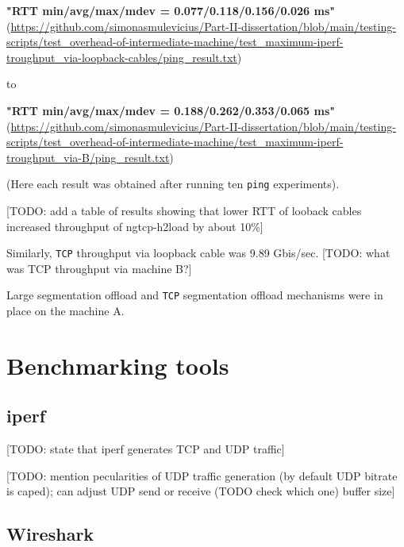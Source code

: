 \documentclass[12pt,a4paper,twoside,openright]{report}
\begin{document}
    \textbf{"RTT min/avg/max/mdev = 0.077/0.118/0.156/0.026 ms"}\\
    (\url{https://github.com/simonasmulevicius/Part-II-dissertation/blob/main/testing-scripts/test_overhead-of-intermediate-machine/test_maximum-iperf-troughput_via-loopback-cables/ping_result.txt})
    
    to
    
    \textbf{"RTT min/avg/max/mdev = 0.188/0.262/0.353/0.065 ms"}\\
    (\url{https://github.com/simonasmulevicius/Part-II-dissertation/blob/main/testing-scripts/test_overhead-of-intermediate-machine/test_maximum-iperf-troughput_via-B/ping_result.txt})
    
    (Here each result was obtained after running ten \texttt{ping} experiments).
    
    [TODO: add a table of results showing that lower RTT of looback cables increased throughput of ngtcp-h2load by about 10\%]
    

    Similarly, \texttt{TCP} throughput via loopback cable was 9.89 Gbis/sec.
    [TODO: what was TCP throughput via machine B?]


    Large segmentation offload and \texttt{TCP} segmentation offload mechanisms were in place on the machine A. 


\section{Benchmarking tools}
\subsection{iperf}
[TODO: state that iperf generates TCP and UDP traffic]

[TODO: mention pecularities of UDP traffic generation (by default UDP bitrate is caped); can adjust UDP send or receive (TODO check which one) buffer size]


\subsection{Wireshark}
\end{document}
